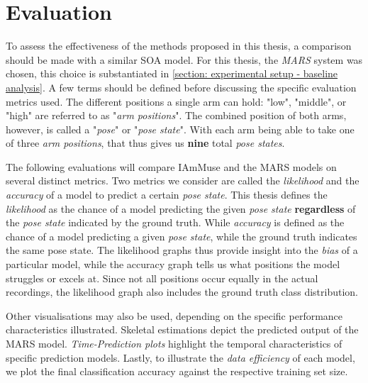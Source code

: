 \chapter{Evaluation}
\label{chapter: evaluation}



To assess the effectiveness of the methods proposed in this thesis, a comparison should be made with a similar SOA model.
For this thesis, the \textit{MARS} system \cite{an2021mars} was chosen, this choice is substantiated in \cref{section: experimental setup - baseline analysis}.
A few terms should be defined before discussing the specific evaluation metrics used.
The different positions a single arm can hold: "low", "middle", or "high" are referred to as  "\textit{arm positions}".
The combined position of both arms, however, is called a "\textit{pose}" or "\textit{pose state}".
With each arm being able to take one of three \textit{arm positions}, that thus gives us \textbf{nine} total \textit{pose states}.

The following evaluations will compare IAmMuse and the MARS models on several distinct metrics.
Two metrics we consider are called the \textit{likelihood} and the \textit{accuracy} of a model to predict a certain \textit{pose state}.
This thesis defines the \textit{likelihood} as the chance of a model predicting the given \textit{pose state} \textbf{regardless} of the \textit{pose state} indicated by the ground truth.
While \textit{accuracy} is defined as the chance of a model predicting a given \textit{pose state}, while the ground truth indicates the same pose state.
The likelihood graphs thus provide insight into the \textit{bias} of a particular model, while the accuracy graph tells us what positions the model struggles or excels at.
Since not all positions occur equally in the actual recordings, the likelihood graph also includes the ground truth class distribution.


Other visualisations may also be used, depending on the specific performance characteristics illustrated.
Skeletal estimations depict the predicted output of the MARS model.
\textit{Time-Prediction plots} highlight the temporal characteristics of specific prediction models.
Lastly, to illustrate the \textit{data efficiency} of each model, we plot the final classification accuracy against the respective training set size.

